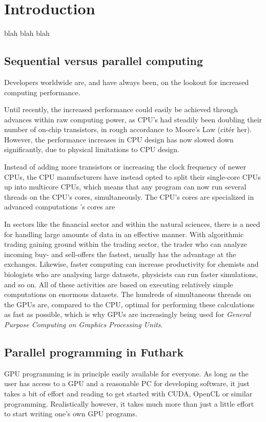 \chapter{Introduction}
blah blah blah
\section{Sequential versus parallel computing}
Developers worldwide are, and have always been, on the lookout for increased
computing performance.

Until recently, the increased performance could easily be
achieved through advances within raw computing power, as CPU's had steadily been
doubling their number of on-chip transistors, in rough accordance to Moore's Law (citér
her).
However, the performance increases in CPU design has now slowed down
significantly, due to physical limitations to CPU design.

Instead of adding more transistors or increasing the clock frequency of newer
CPUs, the CPU manufacturers have instead opted to split their single-core CPUs
up into multicore CPUs, which means that any program can now run several threads
on the CPU's cores, simultaneously.
The CPU's cores are specialized in advanced computations 
's cores are 



In sectors like the financial sector and within the natural sciences, there is a
need for handling large amounts of data in an effective manner. With algorithmic
trading gaining ground within the trading sector, the trader who can analyze
incoming buy- and sell-offers the fastest, usually has the advantage at the
exchanges.
Likewise, faster computing can increase productivity for chemists and
biologists who are analysing large datasets, physicists can run faster
simulations, and so on.
All of these activities are based on executing relatively simple computations on enormous datasets.
The hundreds of simultaneous threads on the GPUs are, compared to the CPU,
optimal for performing these calculations as fast as possible,
which is why GPUs are increasingly being used for \textit{General Purpose
  Computing on Graphics Processing Units}.

\section{Parallel programming in Futhark}
GPU programming is in principle easily available for everyone. As long as the user has access
to a GPU and a reasonable PC for developing software, it just takes a bit of
effort and reading to get started with CUDA, OpenCL or similar programming.
Realistically however, it takes much more than just a little effort to start writing
one's own GPU programs.

